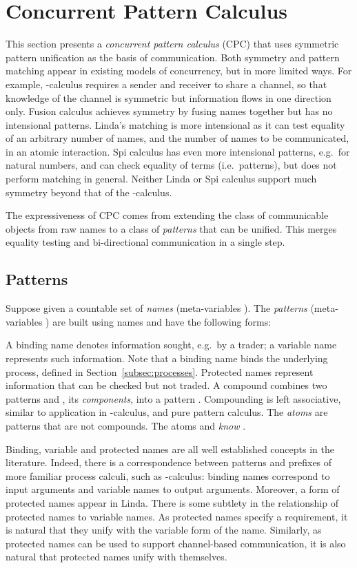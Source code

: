 \documentclass{LMCS}
\begin{document}
\section{Concurrent Pattern Calculus} 
\label{sec:cpc} 
This section presents a {\em concurrent pattern calculus} (CPC) that
uses symmetric pattern unification as the basis of communication. Both
symmetry and pattern matching appear in existing models of
concurrency, but in more limited ways.  For example, -calculus
requires a sender and receiver to share a channel, so that knowledge
of the channel is symmetric but information flows in one direction
only.  Fusion calculus achieves symmetry by fusing names together but
has no intensional patterns.  Linda's matching is more intensional as
it can test equality of an arbitrary number of names, and the number
of names to be communicated, in an atomic interaction.  Spi calculus
has even more intensional patterns, e.g.~for natural numbers, and can
check equality of terms (i.e.\ patterns), but does not perform
matching in general.  Neither Linda or Spi calculus support much
symmetry beyond that of the -calculus.

The expressiveness of CPC comes from extending the class of
communicable objects from raw names to a class of {\em patterns} that
can be unified. This merges equality testing and bi-directional
communication in a single step.


\subsection{Patterns}

Suppose given a countable set of {\em names}  (meta-variables ).
The {\em patterns} (meta-variables )
are built using names and have the following forms:


A binding name  denotes information sought, e.g.\ by a
trader; a variable name  represents such information. Note that a
binding name binds the underlying process, defined in
Section~\ref{subsec:processes}.  Protected names  represent
information that can be checked but not traded.  A compound combines
two patterns  and , its {\em components}, into a pattern
.  Compounding is left associative, similar to application
in -calculus, and pure pattern calculus.
The {\em atoms} are patterns that are not compounds.  The
atoms  and  {\em know} .

Binding, variable and protected names are all well established
concepts in the literature. Indeed, there is a correspondence between
patterns and prefixes of more familiar process calculi, such as
-calculus: binding names correspond to input arguments and
variable names to output arguments.  Moreover, a form of protected
names appear in Linda.
There is some subtlety in the relationship of protected names to
variable names.  As protected names specify a requirement, it is
natural that they unify with the variable form of the name.
Similarly, as protected names can be used to support
channel-based communication, it is also natural that protected names
unify with themselves.
\end{document}
